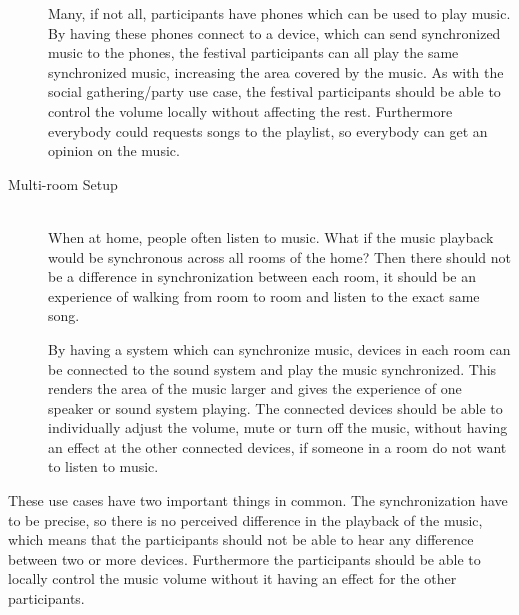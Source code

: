 \begin{description}
        Many, if not all, participants have phones which can be used to play music.
        By having these phones connect to a device, which can send synchronized music to the phones,
        the festival participants can all play the same synchronized music,
        increasing the area covered by the music.
        As with the social gathering/party use case,
        the festival participants should be able to control the volume locally without affecting the rest.
        Furthermore everybody could requests songs to the playlist, so everybody can get an opinion on the music.

    \item[Multi-room Setup] \hfill\\
        When at home, people often listen to music.
        What if the music playback would be synchronous across all rooms of the home?
        Then there should not be a difference in synchronization between each room,
        it should be an experience of walking from room to room and listen to the exact same song.

        By having a system which can synchronize music, devices in each room can be connected to the sound system and play the music synchronized.
        This renders the area of the music larger and gives the experience of one speaker or sound system playing.
        The connected devices should be able to individually adjust the volume, mute or turn off the music,
        without having an effect at the other connected devices, if someone in a room do not want to listen to music. 
\end{description}

These use cases have two important things in common.
The synchronization have to be precise, so there is no perceived difference in the playback of the music,
which means that the participants should not be able to hear any difference between two or more devices.
Furthermore the participants should be able to locally control the music volume without it having an effect for the other participants.
